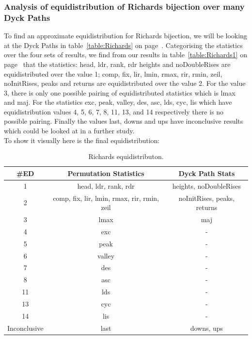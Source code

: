 \documentclass[12pt]{article}
\begin{document}
\subsubsection{Analysis of equidistribution of Richards bijection over many Dyck Paths}
To find an approximate equidistribution for Richards bijection, we will be looking at the Dyck Paths in table~\ref{table:Richards} on page~\pageref{table:Richards}. Categorising the statistics over the four sets of results, we find from our results in table~\ref{table:Richards1} on page~\pageref{table:Richards1} that the statistics: head, ldr, rank, rdr heights and noDoubleRises are equidistributed over the value 1; comp, fix, lir, lmin, rmax, rir, rmin, zeil, noInitRises, peaks and returns are equidistributed over the value 2. For the value 3, there is only one possible pairing of equidistributed statistics which is lmax and maj. For the statistics exc, peak, valley, des, asc, lds, cyc, lis which have equidistribution values 4, 5, 6, 7, 8, 11, 13, and 14 respectively there is no possible pairing. Finally the values last, downs and ups have inconclusive results which could be looked at in a further study.\\
To show it visually here is the final equidistribution:
\begin{table}[H]
\caption{Richards equidistributon.}
\begin{tabular}{c | c | c}
\hline\hline
\#ED & Permutation Statistics & Dyck Path Stats\\ [0.5ex]
\hline
1 & head, ldr, rank, rdr & heights, noDoubleRises  \\
\hline
2 & comp, fix, lir, lmin, rmax, rir, rmin, zeil & noInitRises, peaks, returns\\
\hline
3 & lmax & maj\\
\hline
4 & exc & - \\
\hline
5 & peak & - \\
\hline
6 & valley & - \\
\hline
7 & des & - \\
\hline
8 & asc & - \\
\hline
11 & lds & - \\
\hline
13 & cyc & - \\
\hline
14 & lis & - \\
\hline
Inconclusive & last & downs, ups \\
\hline
\end{tabular}
\label{table:FinalEDRichards}
\end{table}
\end{document}
